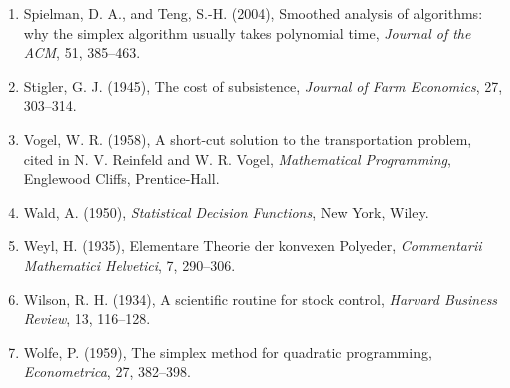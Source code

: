 \documentclass[11pt,a4paper]{article}
\numberwithin{equation}{section}
\theoremstyle{definition}
\begin{document}
\begin{enumerate}
\item Spielman, D. A., and Teng, S.-H. (2004), Smoothed analysis of algorithms: why the simplex algorithm usually takes polynomial time, \emph{Journal of the ACM}, 51, 385--463.
\item Stigler, G. J. (1945), The cost of subsistence, \emph{Journal of Farm Economics}, 27, 303--314.
\item Vogel, W. R. (1958), A short-cut solution to the transportation problem, cited in N. V. Reinfeld and W. R. Vogel, \emph{Mathematical Programming}, Englewood Cliffs, Prentice-Hall.
\item Wald, A. (1950), \emph{Statistical Decision Functions}, New York, Wiley.
\item Weyl, H. (1935), Elementare Theorie der konvexen Polyeder, \emph{Commentarii Mathematici Helvetici}, 7, 290--306.
\item Wilson, R. H. (1934), A scientific routine for stock control, \emph{Harvard Business Review}, 13, 116--128.
\item Wolfe, P. (1959), The simplex method for quadratic programming, \emph{Econometrica}, 27, 382--398.
\end{enumerate}
\end{document}
